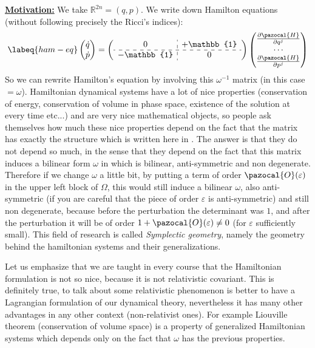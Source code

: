 \documentclass[../main.tex]{subfiles}
\begin{document}
\underline{\textbf{Motivation:}} We take $\mathbb{R}^{2n}=(q,p)$. We write down Hamilton equations (without following precisely the Ricci's indices):
\begin{equation}\labeq{ham-eq}
\begin{pmatrix}
\Dot{q}\\
\Dot{p}
\end{pmatrix}
=
\left(
\begin{array}{c:c}
    0 & +\mathbb{1} \\
    \hdashline
    -\mathbb{1} & 0
\end{array}
\right)
\begin{pmatrix}
\frac{\partial\pazocal{H}}{\partial q^j}\\
\cdots\\
\frac{\partial\pazocal{H}}{\partial p^j}
\end{pmatrix}
\end{equation}
So we can rewrite Hamilton's equation by involving this $\omega^{-1}$ matrix (in this case $=\omega$). Hamiltonian dynamical systems have a lot of nice properties (conservation of energy, conservation of volume in phase space, existence of the solution at every time etc...) and are very nice mathematical objects, so people ask themselves how much these nice properties depend on the fact that the matrix has exactly the structure which is written here in . The answer is that they do not depend so much, in the sense that they depend on the fact that this matrix induces a bilinear form $\omega$ in  which is bilinear, anti-symmetric and non degenerate. Therefore if we change $\omega$ a little bit, by putting a term of order $\pazocal{O}(\varepsilon)$ in the upper left block of $\Omega$, this would still induce a bilinear $\omega$, also anti-symmetric (if you are careful that the piece of order $\varepsilon$ is anti-symmetric) and still non degenerate, because before the perturbation the determinant was $1$, and after the perturbation it will be of order $1+\pazocal{O}(\varepsilon)\neq 0$ (for $\varepsilon$ sufficiently small). This field of research is called \textit{Symplectic geometry}, namely the geometry behind the hamiltonian systems and their generalizations.

Let us emphasize that we are taught in every course that the Hamiltonian formulation is not so nice, because it is not relativistic covariant. This is definitely true, to talk about some relativistic phenomenon is better to have a Lagrangian formulation of our dynamical theory, nevertheless it has many other advantages in any other context (non-relativist ones). For example Liouville theorem (conservation of volume space) is a property of generalized Hamiltonian systems which depends only on the fact that $\omega$ has the previous properties.
\end{document}
